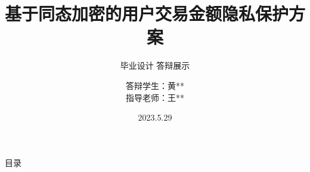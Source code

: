 \documentclass[10pt]{beamer}
\begin{document}
\title{基于同态加密的用户交易金额隐私保护方案}
\subtitle{毕业设计 答辩展示}
\author[黄**]{
  \begin{tabular}{rl}
    答辩学生：& 黄** \\
    指导老师：& 王**
  \end{tabular}
}
\date[2023.5.29]{2023.5.29}

\frame{\titlepage}
\begin{frame}{目录}
    \tableofcontents
\end{frame}





\end{document}

